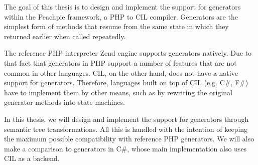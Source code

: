 \documentclass[12pt,a4paper]{report}
\begin{document}
The goal of this thesis is to design and implement the support for generators within the Peachpie framework, a PHP to CIL compiler. Generators are the simplest form of methods that resume from the same state in which they returned earlier when called repeatedly. 

The reference PHP interpreter Zend engine supports generators natively. Due to that fact that generators in PHP support a number of features that are not common in other languages. CIL, on the other hand, does not have a native support for generators. Therefore, languages built on top of CIL (e.g. C\#, F\#) have to implement them by other means, such as by rewriting the original generator methods into state machines. 

In this thesis, we will design and implement the support for generators through semantic tree transformations. All this is handled with the intention of keeping the maximum possible compatibility with reference PHP generators. We will also make a comparison to generators in C\#, whose main implementation also uses CIL as a backend.
\end{document}
